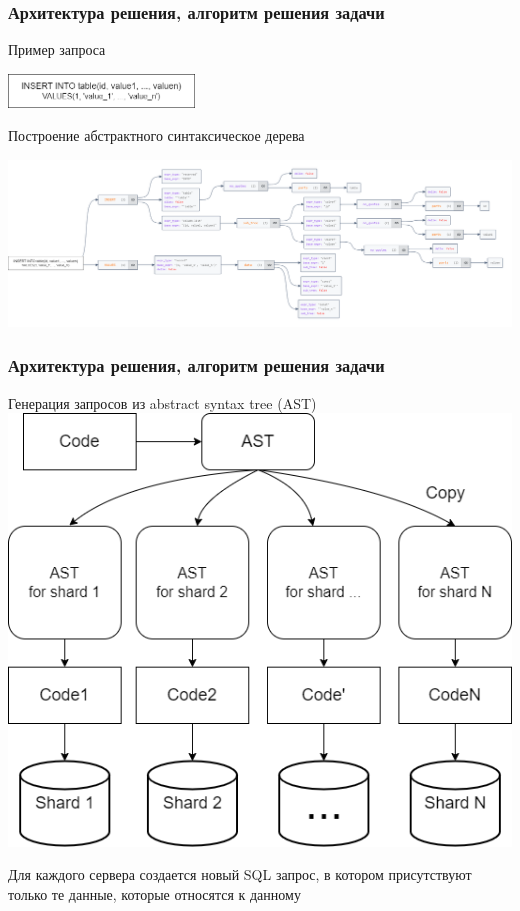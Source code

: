 \documentclass[pdf, hyperref={unicode}, aspectratio=169]{beamer}
\begin{document}
\begin{frame}
	\frametitle{Архитектура решения, алгоритм решения задачи}
	Пример запроса

	\includegraphics[height=9mm]{img/qeury1.png}

	Построение абстрактного синтаксическое дерева
	
	\includegraphics[width=\textwidth]{img/AST.png}

\end{frame}


\begin{frame}
	\frametitle{Архитектура решения, алгоритм решения задачи}
	\begin{minipage}{.6\textwidth}
		Генерация запросов из abstract syntax tree (AST)
		\includegraphics[width=\textheight]{img/generation.png}
	\end{minipage}%
	\begin{minipage}{.4\textwidth}
		Для каждого сервера создается новый SQL запрос, в котором присутствуют только те данные, которые относятся к данному
	\end{minipage}%
\end{frame}
\end{document}
